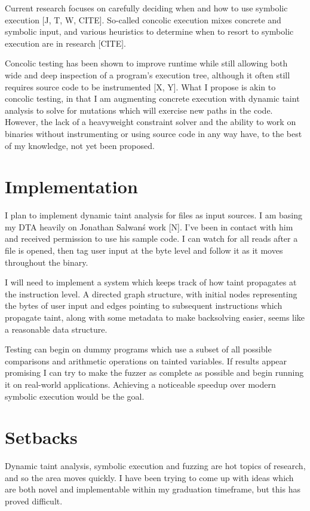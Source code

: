 \documentclass[10pt, twocolumn, times, nocopyrightspace, preprint]{sigplanconf}
\begin{document}
Current research focuses on carefully deciding when and how to use symbolic execution [J, T, W, CITE]. So-called concolic execution mixes concrete and symbolic input, and various heuristics to determine when to resort to symbolic execution are in research [CITE].

Concolic testing has been shown to improve runtime while still allowing both wide and deep inspection of a program's execution tree, although it often still requires source code to be instrumented [X, Y]. What I propose is akin to concolic testing, in that I am augmenting concrete execution with dynamic taint analysis to solve for mutations which will exercise new paths in the code. However, the lack of a heavyweight constraint solver and the ability to work on binaries without instrumenting or using source code in any way have, to the best of my knowledge, not yet been proposed.

\section{Implementation}

I plan to implement dynamic taint analysis for files as input sources. I am basing my DTA heavily on Jonathan Salwan\'s work [N]. I've been in contact with him and received permission to use his sample code. I can watch for all reads after a file is opened, then tag user input at the byte level and follow it as it moves throughout the binary.
	
I will need to implement a system which keeps track of how taint propagates at the instruction level. A directed graph structure, with initial nodes representing the bytes of user input and edges pointing to subsequent instructions which propagate taint, along with some metadata to make backsolving easier, seems like a reasonable data structure.

Testing can begin on dummy programs which use a subset of all possible comparisons and arithmetic operations on tainted variables. If results appear promising I can try to make the fuzzer as complete as possible and begin running it on real-world applications. Achieving a noticeable speedup over modern symbolic execution would be the goal.
	
\section{Setbacks}

Dynamic taint analysis, symbolic execution and fuzzing are hot topics of research, and so the area moves quickly. I have been trying to come up with ideas which are both novel and implementable within my graduation timeframe, but this has proved difficult.
\end{document}
